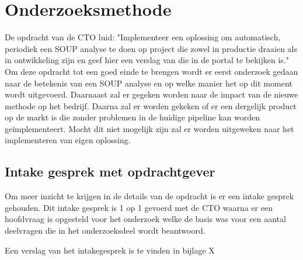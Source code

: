 
\chapter{Onderzoeksmethode} %

\label{OnderzoeksMethode} %

De opdracht van de CTO luid: "Implementeer een oplossing om automatisch, periodiek een SOUP analyse te doen op project die zowel in productie draaien als in ontwikkeling zijn en geef hier een verslag van die in de portal te bekijken is." Om deze opdracht tot een goed einde te brengen wordt er eerst onderzoek gedaan naar de betekenis van een SOUP analyse en op welke manier het op dit moment wordt uitgevoerd. Daarnaast zal er gegeken worden naar de impact van de nieuwe methode op het bedrijf. Daarna zal er worden gekeken of er een dergelijk product op de markt is die zonder problemen in de huidige pipeline kan worden ge\"implementeert. Mocht dit niet mogelijk zijn zal er worden uitgeweken naar het implementeren van eigen oplossing.

\section{Intake gesprek met opdrachtgever}
Om meer inzicht te krijgen in de details van de opdracht is er een intake gesprek gehouden. Dit intake gesprek is 1 op 1 gevoerd met de CTO waarna er een hoofdvraag is opgesteld voor het onderzoek welke de basis was voor een aantal deelvragen die in het onderzoeksdeel wordt beantwoord. 

Een verslag van het intakegesprek is te vinden in bijlage X%

